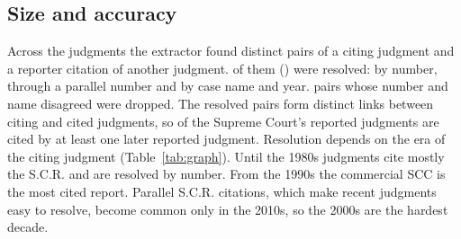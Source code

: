 \subsection{Size and accuracy}
\label{sec:graphres}
Across the \GraphTextOK{} judgments the extractor found \GraphUnits{} distinct pairs of a citing judgment and a reporter citation of another judgment. \GraphResolved{} of them (\GraphResolvedPct) were resolved: \GraphExact{} by number, \GraphParallel{} through a parallel number and \GraphName{} by case name and year. \GraphConflict{} pairs whose number and name disagreed were dropped. The resolved pairs form \GraphEdges{} distinct links between \GraphCiting{} citing and \GraphCited{} cited judgments, so \GraphCitedPct{} of the Supreme Court's reported judgments are cited by at least one later reported judgment. Resolution depends on the era of the citing judgment (Table~\ref{tab:graph}). Until the 1980s judgments cite mostly the S.C.R. and are resolved by number. From the 1990s the commercial SCC is the most cited report. Parallel S.C.R. citations, which make recent judgments easy to resolve, become common only in the 2010s, so the 2000s are the hardest decade.

\begin{table}[t]
\caption{Citations of other reported judgments, by decade of the citing judgment, and how they were resolved.}
\label{tab:graph}
\centering
\footnotesize
\setlength{\tabcolsep}{4pt}

\end{table}

